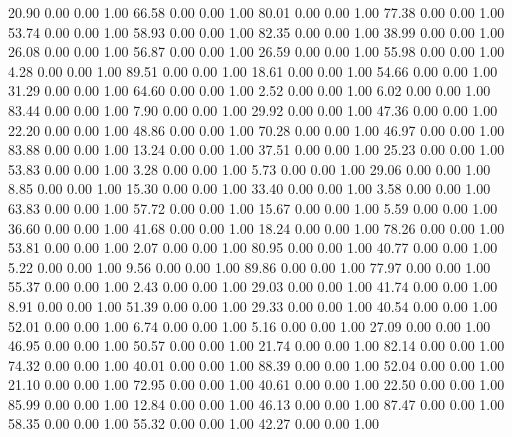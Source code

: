    20.90   0.00   0.00   1.00
   66.58   0.00   0.00   1.00
   80.01   0.00   0.00   1.00
   77.38   0.00   0.00   1.00
   53.74   0.00   0.00   1.00
   58.93   0.00   0.00   1.00
   82.35   0.00   0.00   1.00
   38.99   0.00   0.00   1.00
   26.08   0.00   0.00   1.00
   56.87   0.00   0.00   1.00
   26.59   0.00   0.00   1.00
   55.98   0.00   0.00   1.00
    4.28   0.00   0.00   1.00
   89.51   0.00   0.00   1.00
   18.61   0.00   0.00   1.00
   54.66   0.00   0.00   1.00
   31.29   0.00   0.00   1.00
   64.60   0.00   0.00   1.00
    2.52   0.00   0.00   1.00
    6.02   0.00   0.00   1.00
   83.44   0.00   0.00   1.00
    7.90   0.00   0.00   1.00
   29.92   0.00   0.00   1.00
   47.36   0.00   0.00   1.00
   22.20   0.00   0.00   1.00
   48.86   0.00   0.00   1.00
   70.28   0.00   0.00   1.00
   46.97   0.00   0.00   1.00
   83.88   0.00   0.00   1.00
   13.24   0.00   0.00   1.00
   37.51   0.00   0.00   1.00
   25.23   0.00   0.00   1.00
   53.83   0.00   0.00   1.00
    3.28   0.00   0.00   1.00
    5.73   0.00   0.00   1.00
   29.06   0.00   0.00   1.00
    8.85   0.00   0.00   1.00
   15.30   0.00   0.00   1.00
   33.40   0.00   0.00   1.00
    3.58   0.00   0.00   1.00
   63.83   0.00   0.00   1.00
   57.72   0.00   0.00   1.00
   15.67   0.00   0.00   1.00
    5.59   0.00   0.00   1.00
   36.60   0.00   0.00   1.00
   41.68   0.00   0.00   1.00
   18.24   0.00   0.00   1.00
   78.26   0.00   0.00   1.00
   53.81   0.00   0.00   1.00
    2.07   0.00   0.00   1.00
   80.95   0.00   0.00   1.00
   40.77   0.00   0.00   1.00
    5.22   0.00   0.00   1.00
    9.56   0.00   0.00   1.00
   89.86   0.00   0.00   1.00
   77.97   0.00   0.00   1.00
   55.37   0.00   0.00   1.00
    2.43   0.00   0.00   1.00
   29.03   0.00   0.00   1.00
   41.74   0.00   0.00   1.00
    8.91   0.00   0.00   1.00
   51.39   0.00   0.00   1.00
   29.33   0.00   0.00   1.00
   40.54   0.00   0.00   1.00
   52.01   0.00   0.00   1.00
    6.74   0.00   0.00   1.00
    5.16   0.00   0.00   1.00
   27.09   0.00   0.00   1.00
   46.95   0.00   0.00   1.00
   50.57   0.00   0.00   1.00
   21.74   0.00   0.00   1.00
   82.14   0.00   0.00   1.00
   74.32   0.00   0.00   1.00
   40.01   0.00   0.00   1.00
   88.39   0.00   0.00   1.00
   52.04   0.00   0.00   1.00
   21.10   0.00   0.00   1.00
   72.95   0.00   0.00   1.00
   40.61   0.00   0.00   1.00
   22.50   0.00   0.00   1.00
   85.99   0.00   0.00   1.00
   12.84   0.00   0.00   1.00
   46.13   0.00   0.00   1.00
   87.47   0.00   0.00   1.00
   58.35   0.00   0.00   1.00
   55.32   0.00   0.00   1.00
   42.27   0.00   0.00   1.00
